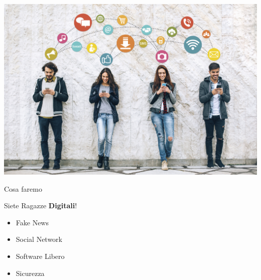 {\includegraphics[width=\paperwidth,height=\paperheight]{images/competing_on_social_media.jpg}}
\begin{frame}{Cosa faremo}
    \vspace{0.8cm}
    \begin{block}{Siete Ragazze \textbf{Digitali}!}
      		\begin{itemize}
      		    \item Fake News
    			\item Social Network
    			\item Software Libero
    			\item Sicurezza
    		\end{itemize}
    \end{block}
\end{frame}